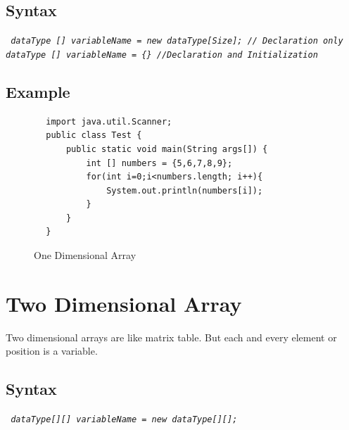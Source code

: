 \documentclass[openany]{book}  %
\begin{document}
\subsection{Syntax}
\begin{center}
    \tt{
        \textit{dataType [] variableName = new dataType[Size]; // Declaration only \\
        dataType [] variableName = \{\} //Declaration and Initialization }
    }
\end{center}
% 
%
\subsection{Example}
\begin{center}
    \begin{verbatim}
        import java.util.Scanner;
        public class Test {
            public static void main(String args[]) {
                int [] numbers = {5,6,7,8,9};
                for(int i=0;i<numbers.length; i++){
                    System.out.println(numbers[i]);
                }
            }
        }
    \end{verbatim}
\end{center}
% 
% 
\begin{figure}[h!t]
    \begin{center}
        \caption{One Dimensional Array}
    \end{center}
\end{figure}
% 
% 
\section{Two Dimensional Array}
Two dimensional arrays are like matrix table. But each and every 
element or position is a variable.
% 
% 
\subsection{Syntax}
\begin{center}
    \tt{
        \textit{dataType[][] variableName = new dataType[][];}
    }
\end{center}
\end{document}
